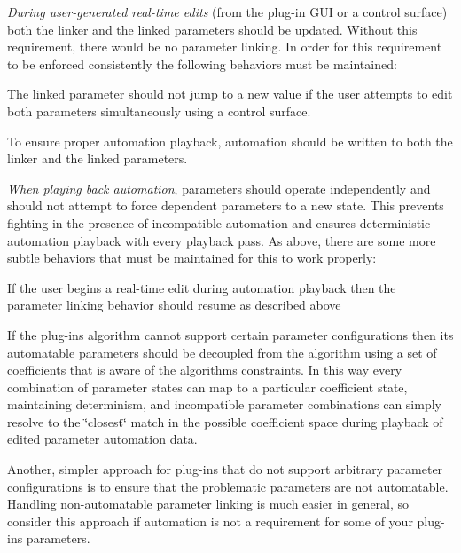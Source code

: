 {\itshape During user-\/generated real-\/time edits} (from the plug-\/in G\+UI or a control surface) both the linker and the linked parameters should be updated. Without this requirement, there would be no parameter linking. In order for this requirement to be enforced consistently the following behaviors must be maintained\+: 
\begin{DoxyItemize}
\item The linked parameter should not jump to a new value if the user attempts to edit both parameters simultaneously using a control surface.  
\item To ensure proper automation playback, automation should be written to both the linker and the linked parameters.  
\end{DoxyItemize}

{\itshape When playing back automation}, parameters should operate independently and should not attempt to force dependent parameters to a new state. This prevents fighting in the presence of incompatible automation and ensures deterministic automation playback with every playback pass. As above, there are some more subtle behaviors that must be maintained for this to work properly\+: 
\begin{DoxyItemize}
\item If the user begins a real-\/time edit during automation playback then the parameter linking behavior should resume as described above  
\item If the plug-\/in\textquotesingle{}s algorithm cannot support certain parameter configurations then its automatable parameters should be decoupled from the algorithm using a set of coefficients that is aware of the algorithm\textquotesingle{}s constraints. In this way every combination of parameter states can map to a particular coefficient state, maintaining determinism, and incompatible parameter combinations can simply resolve to the \char`\"{}closest\char`\"{} match in the possible coefficient space during playback of edited parameter automation data. 
\item Another, simpler approach for plug-\/ins that do not support arbitrary parameter configurations is to ensure that the problematic parameters are not automatable. Handling non-\/automatable parameter linking is much easier in general, so consider this approach if automation is not a requirement for some of your plug-\/in\textquotesingle{}s parameters.  
\end{DoxyItemize}


